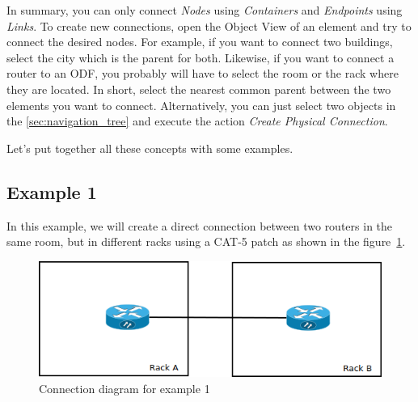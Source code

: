\documentclass[a4paper]{article}
\begin{document}
		In summary, you can only connect \textit{Nodes} using \textit{Containers} and \textit{Endpoints} using \textit{Links}. To create new connections, open the Object View of an element and try to connect the desired nodes. For example, if you want to connect two buildings, select the city which is the parent for both. Likewise, if you want to connect a router to an ODF, you probably will have to select the room or the rack where they are located. In short, select the nearest common parent between the two elements you want to connect. Alternatively, you can just select two objects in the \ref{sec:navigation_tree} and execute the action \textit{Create Physical Connection}.
		
		Let's put together all these concepts with some examples. 
		\subsection{Example 1} \label{sec:physical_connections_example_1}
			In this example, we will create a direct connection between two routers in the same room, but in different racks using a CAT-5 patch as shown in the figure~\ref{fig:l1_example_1}.\newline
			\begin{figure}[h!]
				\centering
				\includegraphics[width=0.5\linewidth]{img/l1_example_1.png}
				\caption{Connection diagram for example 1}
				\label{fig:l1_example_1}
			\end{figure}
			
\end{document}
